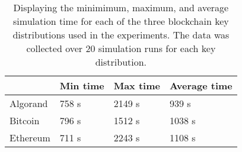 \begin{table}[h]
    \centering
    \begin{tabular}{|l|l|l|l|}
        \hline
                  & Min time & Max time & Average time \\ \hline
        Algorand  & 758 s   & 2149 s    & 939  s       \\ \hline
        Bitcoin   & 796 s   & 1512 s    & 1038 s       \\ \hline
        Ethereum  & 711 s   & 2243 s    & 1108 s       \\ \hline
    \end{tabular}
    \caption{Displaying the minimimum, maximum, and average simulation time for each of the three blockchain key distributions used in the experiments. The data was collected over 20 simulation runs for each key distribution.}
    \label{tab:times}
\end{table}
